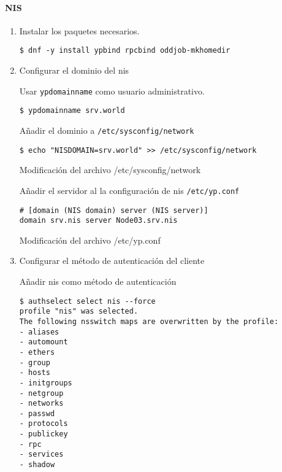 \documentclass[../main.tex]{subfiles}
\begin{document}
\paragraph{NIS}
\begin{enumerate}
  \item Instalar los paquetes necesarios.
        \begin{listing}[H]
\begin{verbatim}
$ dnf -y install ypbind rpcbind oddjob-mkhomedir
\end{verbatim}
        \end{listing}

  \item Configurar el dominio del \acrshort{nis}

        Usar \texttt{ypdomainname} como usuario administrativo.
        \begin{listing}[H]
\begin{verbatim}
$ ypdomainname srv.world
\end{verbatim}
        \end{listing}
        Añadir el dominio a \texttt{/etc/sysconfig/network}
        \begin{listing}[H]
\begin{verbatim}
$ echo "NISDOMAIN=srv.world" >> /etc/sysconfig/network
\end{verbatim}
          \label{list:sysnetwork}
          \caption{Modificación del archivo /etc/sysconfig/network}
        \end{listing}
        Añadir el servidor al la configuración de \acrshort{nis} \texttt{/etc/yp.conf}
        \begin{listing}[H]
\begin{verbatim}
# [domain (NIS domain) server (NIS server)]
domain srv.nis server Node03.srv.nis
\end{verbatim}
          \label{list:yp}
          \caption{Modificación del archivo /etc/yp.conf}
        \end{listing}

  \item Configurar el método de autenticación del cliente

        Añadir \acrshort{nis} como método de autenticación
        \begin{listing}[H]
\begin{verbatim}
$ authselect select nis --force
profile "nis" was selected.
The following nsswitch maps are overwritten by the profile:
- aliases
- automount
- ethers
- group
- hosts
- initgroups
- netgroup
- networks
- passwd
- protocols
- publickey
- rpc
- services
- shadow


\end{verbatim}
\end{listing}
\end{enumerate}
\end{document}
